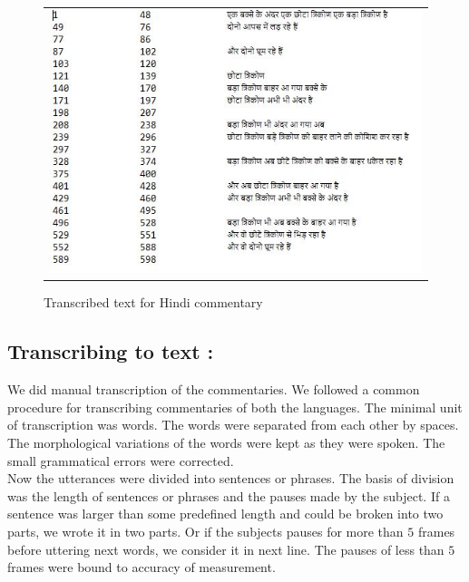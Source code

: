 \def\DevnagVersion{2.15}\documentclass[a4paper, 11pt, notitlepage]{report}
\begin{document}
\begin{figure}[h]
\center
\begin{tabular}{c}
\includegraphics[scale=0.70]{comm.png}
\end{tabular}
\label{tab:gt}
\caption{Transcribed text for Hindi commentary}
\end{figure} 

\subsection{Transcribing to text :}
We did manual transcription of the commentaries. We followed a common procedure for transcribing commentaries of both the languages. The minimal unit of transcription was words. The words were separated from each other by spaces. The morphological variations of the words were kept as they were spoken. The small grammatical errors were corrected.\\
Now the utterances were divided into sentences or phrases. The basis of division was the length of sentences or phrases and the pauses made by the subject. If a sentence was larger than some predefined length and could be broken into two parts, we wrote it in two parts. Or if the subjects pauses for more than $5$ frames before uttering next words, we consider it in next line. The pauses of less than $5$ frames were bound to accuracy of measurement.\\
\end{document}
